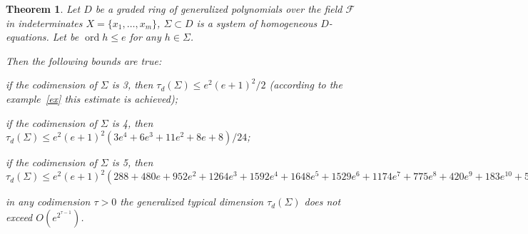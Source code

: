 \documentclass[a4paper,reqno,12pt]{amsart}
\theoremstyle{plain}
\newtheorem{theorem}{Theorem}
\theoremstyle{remark}
\theoremstyle{definition}
\renewcommand{\le}{\leqslant}
\DeclareMathOperator {\ord}{ord}
\def\ord{\operatorname{ord}}
\def\F{\mathcal {F}}
\begin{document}
\begin{theorem}\label{prim2}
Let $D$ be a graded
ring of generalized polynomials over the field $\F$ in indeterminates
$X = \{x_1, \dots, x_m \}$,
$\Sigma \subset D$ is a system of homogeneous $D$-equations.
Let be
$\ord h \le e$ for any
$h\in\Sigma$.

Then the following bounds are true:

if the codimension of $\Sigma$ is 3, then
$\tau_d(\Sigma) \le e^2 (e + 1)^2/2$ (according to the example~\ref{ex}
this estimate is achieved);

if the codimension of $\Sigma$ is 4, then
$\tau_d(\Sigma)\le e^2(e+1)^2(3e^4+6e^3+11e^2+8e+8)/24$;

if the codimension of $\Sigma$ is 5, then
$\tau_d(\Sigma)\le 
  e^2 (e+1)^2 (288 +  480 e + 952 e^2  + 1264 e^3  + 1592 e^4
                          + 1648 e^5  + 1529 e^6  + 1174 e^7+ 775 e^8  + 420 e^9  + 183 e^10   + 54 e^11
         + 9 e^12  ) (e + 1)^2 /1152 
$

in any codimension $\tau> 0$ the generalized typical dimension 
$\tau_d(\Sigma)$
does not exceed $O(e^{2^{\tau-1}})$.
\end{theorem}  
\end{document}
